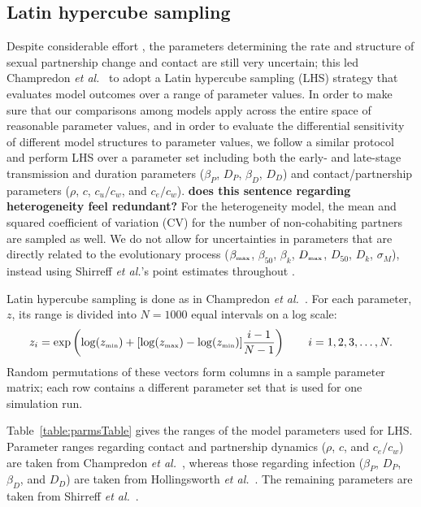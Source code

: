 \documentclass[10pt,letterpaper]{article}
\newcommand{\etal}{\textit{et al.}}
\newcommand{\tsub}[2]{#1_{{\textrm{\tiny #2}}}}
\newcommand{\todo}[1]{\textbf{#1}}
\begin{document}
\subsection*{Latin hypercube sampling}

Despite considerable effort \cite{hollingsworth_hiv1_2008,champredon_hiv_2013}, the parameters determining the rate and structure of sexual partnership change and contact are still very uncertain; this led Champredon \etal\ \cite{champredon_hiv_2013} to adopt a Latin hypercube sampling (LHS) strategy \cite{blower_drugs_1991} that evaluates model outcomes over a range of parameter values. In order to make sure that our comparisons among models apply across the entire space of reasonable parameter values, and in order to evaluate the differential sensitivity of different model structures to parameter values, we follow a similar protocol and perform LHS over a parameter set including both the early- and late-stage transmission and duration parameters ($\beta_P$, $D_P$, $\beta_D$, $D_D$) and contact/partnership parameters ($\rho$, $c$, $c_u/c_w$, and $c_e/c_w$). \todo{does this sentence regarding heterogeneity feel redundant?} For the heterogeneity model, the mean and squared coefficient of variation (CV) for the number of non-cohabiting partners are sampled as well. We do not allow for uncertainties in parameters that are directly related to the evolutionary process ($\tsub{\beta}{max}$, $\beta_{50}$, $\beta_k$, $\tsub{D}{max}$, $D_{50}$, $D_k$, $\sigma_M$), instead using Shirreff \etal's point estimates throughout \cite{shirreff_transmission_2011}.

Latin hypercube sampling is done as in Champredon \etal\ \cite{champredon_hiv_2013}. For each parameter, $z$, its range is divided into $N = 1000$ equal intervals on a log scale:
\begin{equation}
z_i = \exp\left(\log(\tsub{z}{min}) + [\log(\tsub{z}{max}) - \log(\tsub{z}{min})] \frac{i-1}{N-1}\right) \qquad i = 1, 2, 3, \dots,N.
\end{equation}
Random permutations of these vectors form columns in a sample parameter matrix; each row contains a different parameter set that is used for one simulation run.

Table~\ref{table:parmsTable} gives the ranges of the model parameters used for LHS. Parameter ranges regarding contact and partnership dynamics ($\rho$, $c$, and $c_e/c_w$) are taken from Champredon \etal\ \cite{champredon_hiv_2013}, whereas those regarding infection ($\beta_P$, $D_P$, $\beta_D$, and $D_D$) are taken from Hollingsworth \etal\ \cite{hollingsworth_hiv1_2008}. The remaining parameters are taken from Shirreff \etal\ \cite{shirreff_transmission_2011}.
\end{document}
